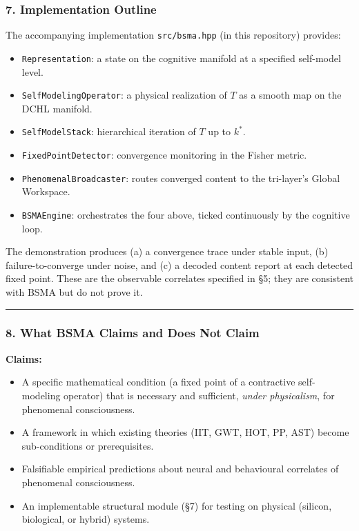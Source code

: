 \documentclass[
  11pt,
  a4paper,
]{article}
\providecommand{\tightlist}{%
  \setlength{\itemsep}{0pt}\setlength{\parskip}{0pt}}
\begin{document}
\subsubsection{7. Implementation Outline}\label{implementation-outline}

The accompanying implementation \texttt{src/bsma.hpp} (in this
repository) provides:

\begin{itemize}
\tightlist
\item
  \texttt{Representation}: a state on the cognitive manifold at a
  specified self-model level.
\item
  \texttt{SelfModelingOperator}: a physical realization of \(T\) as a
  smooth map on the DCHL manifold.
\item
  \texttt{SelfModelStack}: hierarchical iteration of \(T\) up to
  \(k^*\).
\item
  \texttt{FixedPointDetector}: convergence monitoring in the Fisher
  metric.
\item
  \texttt{PhenomenalBroadcaster}: routes converged content to the
  tri-layer's Global Workspace.
\item
  \texttt{BSMAEngine}: orchestrates the four above, ticked continuously
  by the cognitive loop.
\end{itemize}

The demonstration produces (a) a convergence trace under stable input,
(b) failure-to-converge under noise, and (c) a decoded content report at
each detected fixed point. These are the observable correlates specified
in §5; they are consistent with BSMA but do not prove it.

\begin{center}\rule{0.5\linewidth}{0.5pt}\end{center}

\subsubsection{8. What BSMA Claims and Does Not
Claim}\label{what-bsma-claims-and-does-not-claim}

\textbf{Claims:}

\begin{itemize}
\tightlist
\item
  A specific mathematical condition (a fixed point of a contractive
  self-modeling operator) that is necessary and sufficient, \emph{under
  physicalism}, for phenomenal consciousness.
\item
  A framework in which existing theories (IIT, GWT, HOT, PP, AST) become
  sub-conditions or prerequisites.
\item
  Falsifiable empirical predictions about neural and behavioural
  correlates of phenomenal consciousness.
\item
  An implementable structural module (§7) for testing on physical
  (silicon, biological, or hybrid) systems.
\end{itemize}
\end{document}
